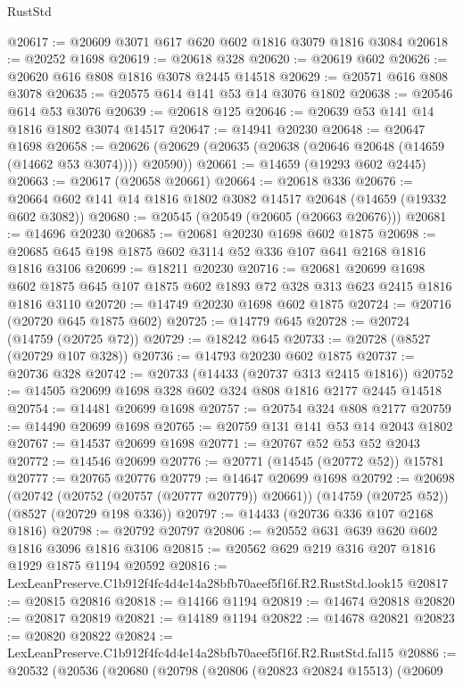 \begin{lexlean}{RustStd}
\begin{coremodule}
@20617 := @20609 @3071 @617 @620 @602 @1816 @3079 @1816 @3084
@20618 := @20252 @1698
@20619 := @20618 @328
@20620 := @20619 @602
@20626 := @20620 @616 @808 @1816 @3078 @2445 @14518
@20629 := @20571 @616 @808 @3078
@20635 := @20575 @614 @141 @53 @14 @3076 @1802
@20638 := @20546 @614 @53 @3076
@20639 := @20618 @125
@20646 := @20639 @53 @141 @14 @1816 @1802 @3074 @14517
@20647 := @14941 @20230
@20648 := @20647 @1698
@20658 := @20626 (@20629 (@20635 (@20638 (@20646 @20648 (@14659 (@14662 @53 @3074)))) @20590))
@20661 := @14659 (@19293 @602 @2445)
@20663 := @20617 (@20658 @20661)
@20664 := @20618 @336
@20676 := @20664 @602 @141 @14 @1816 @1802 @3082 @14517 @20648 (@14659 (@19332 @602 @3082))
@20680 := @20545 (@20549 (@20605 (@20663 @20676)))
@20681 := @14696 @20230
@20685 := @20681 @20230 @1698 @602 @1875
@20698 := @20685 @645 @198 @1875 @602 @3114 @52 @336 @107 @641 @2168 @1816 @1816 @3106
@20699 := @18211 @20230
@20716 := @20681
    @20699
    @1698
    @602
    @1875
    @645
    @107
    @1875
    @602
    @1893
    @72
    @328
    @313
    @623
    @2415
    @1816
    @1816
    @3110
@20720 := @14749 @20230 @1698 @602 @1875
@20724 := @20716 (@20720 @645 @1875 @602)
@20725 := @14779 @645
@20728 := @20724 (@14759 (@20725 @72))
@20729 := @18242 @645
@20733 := @20728 (@8527 (@20729 @107 @328))
@20736 := @14793 @20230 @602 @1875
@20737 := @20736 @328
@20742 := @20733 (@14433 (@20737 @313 @2415 @1816))
@20752 := @14505 @20699 @1698 @328 @602 @324 @808 @1816 @2177 @2445 @14518
@20754 := @14481 @20699 @1698
@20757 := @20754 @324 @808 @2177
@20759 := @14490 @20699 @1698
@20765 := @20759 @131 @141 @53 @14 @2043 @1802
@20767 := @14537 @20699 @1698
@20771 := @20767 @52 @53 @52 @2043
@20772 := @14546 @20699
@20776 := @20771 (@14545 (@20772 @52)) @15781
@20777 := @20765 @20776
@20779 := @14647 @20699 @1698
@20792 := @20698
    (@20742 (@20752 (@20757 (@20777 @20779)) @20661))
    (@14759 (@20725 @52))
    (@8527 (@20729 @198 @336))
@20797 := @14433 (@20736 @336 @107 @2168 @1816)
@20798 := @20792 @20797
@20806 := @20552 @631 @639 @620 @602 @1816 @3096 @1816 @3106
@20815 := @20562 @629 @219 @316 @207 @1816 @1929 @1875 @1194 @20592
@20816 := LexLeanPreserve.C1b912f4fc4d4e14a28bfb70aeef5f16f.R2.RustStd.look15
@20817 := @20815 @20816
@20818 := @14166 @1194
@20819 := @14674 @20818
@20820 := @20817 @20819
@20821 := @14189 @1194
@20822 := @14678 @20821
@20823 := @20820 @20822
@20824 := LexLeanPreserve.C1b912f4fc4d4e14a28bfb70aeef5f16f.R2.RustStd.fal15
@20886 := @20532
    (@20536
      (@20680
        (@20798
          (@20806
            (@20823 @20824 @15513)
            (@20609

\end{coremodule}
\end{lexlean}
